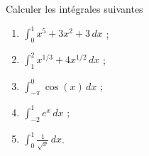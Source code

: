 
\begin{exercice}\label{exoTD5-a-0001}

Calculer les intégrales suivantes
\begin{enumerate}
\item $\displaystyle \int_0^1 x^5+3x^2+3 \, dx $ ;
  \item $\displaystyle \int_1^2 x^{1/3}+4x^{1/2} \, dx $ ;
      \item $\displaystyle \int_{-\pi}^{0} \cos(x) \, dx $ ;
        \item $\displaystyle \int_{-2}^{1} e^x \, dx$ ;
          \item $\displaystyle \int_{0}^{1} \frac{1}{\sqrt{x}} \, dx$.
\end{enumerate}

\end{exercice}
